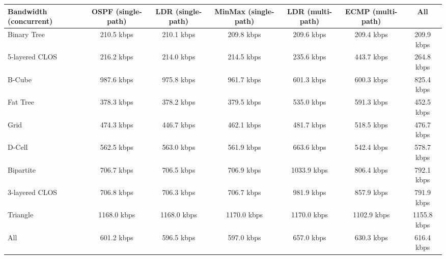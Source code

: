 \begin{tabular}{l|cccccc}
Bandwidth (concurrent) & OSPF (single-path) & LDR (single-path) & MinMax (single-path) & LDR (multi-path) & ECMP (multi-path) & All         \\
\hline
Binary Tree            & 210.5 kbps         & 210.1 kbps        & 209.8 kbps           & 209.6 kbps       & 209.4 kbps        & 209.9 kbps  \\
5-layered CLOS         & 216.2 kbps         & 214.0 kbps        & 214.5 kbps           & 235.6 kbps       & 443.7 kbps        & 264.8 kbps  \\
B-Cube                 & 987.6 kbps         & 975.8 kbps        & 961.7 kbps           & 601.3 kbps       & 600.3 kbps        & 825.4 kbps  \\
Fat Tree               & 378.3 kbps         & 378.2 kbps        & 379.5 kbps           & 535.0 kbps       & 591.3 kbps        & 452.5 kbps  \\
Grid                   & 474.3 kbps         & 446.7 kbps        & 462.1 kbps           & 481.7 kbps       & 518.5 kbps        & 476.7 kbps  \\
D-Cell                 & 562.5 kbps         & 563.0 kbps        & 561.9 kbps           & 663.6 kbps       & 542.4 kbps        & 578.7 kbps  \\
Bipartite              & 706.7 kbps         & 706.5 kbps        & 706.9 kbps           & 1033.9 kbps      & 806.4 kbps        & 792.1 kbps  \\
3-layered CLOS         & 706.8 kbps         & 706.3 kbps        & 706.7 kbps           & 981.9 kbps       & 857.9 kbps        & 791.9 kbps  \\
Triangle               & 1168.0 kbps        & 1168.0 kbps       & 1170.0 kbps          & 1170.0 kbps      & 1102.9 kbps       & 1155.8 kbps \\
All                    & 601.2 kbps         & 596.5 kbps        & 597.0 kbps           & 657.0 kbps       & 630.3 kbps        & 616.4 kbps  \\
\end{tabular}